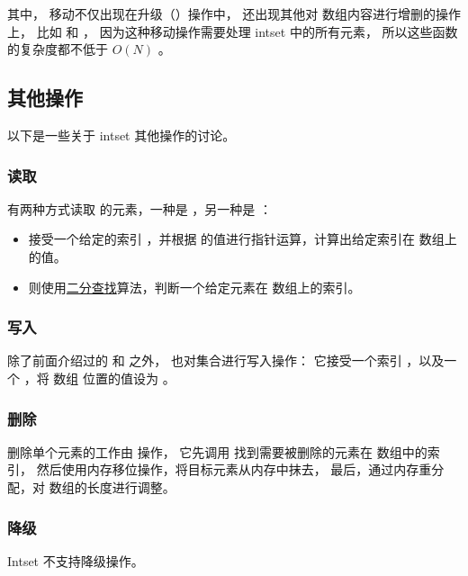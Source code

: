 \documentclass[a4paper,11pt,english]{sphinxmanual}
\begin{document}
其中，
移动不仅出现在升级（）操作中，
还出现其他对  数组内容进行增删的操作上，
比如  和  ，
因为这种移动操作需要处理 intset 中的所有元素，
所以这些函数的复杂度都不低于 $O(N)$ 。


\subsection{其他操作}
\label{compress-datastruct/intset:id14}
以下是一些关于 intset 其他操作的讨论。


\subsubsection{读取}
\label{compress-datastruct/intset:id15}
有两种方式读取  的元素，一种是  ，另一种是  ：
\begin{itemize}
\item {} 
 接受一个给定的索引  ，并根据  的值进行指针运算，计算出给定索引在  数组上的值。

\item {} 
 则使用\href{http://en.wikipedia.org/wiki/Binary\_search\_algorithm}{二分查找}算法，判断一个给定元素在  数组上的索引。

\end{itemize}


\subsubsection{写入}
\label{compress-datastruct/intset:id17}
除了前面介绍过的  和  之外，  也对集合进行写入操作：
它接受一个索引  ，以及一个  ，将  数组  位置的值设为  。


\subsubsection{删除}
\label{compress-datastruct/intset:id18}
删除单个元素的工作由  操作，
它先调用  找到需要被删除的元素在  数组中的索引，
然后使用内存移位操作，将目标元素从内存中抹去，
最后，通过内存重分配，对  数组的长度进行调整。


\subsubsection{降级}
\label{compress-datastruct/intset:id19}
Intset 不支持降级操作。
\end{document}
